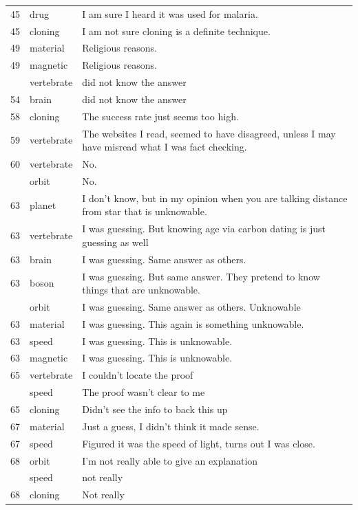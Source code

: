 \documentclass[
  doc,floatsintext]{apa6}
\begin{document}
\begin{longtable}[t]{>{}r>{}l>{\raggedright\arraybackslash}p{30em}}
45 & drug & I am sure I heard it was used for malaria.\\
45 & cloning & I am not sure cloning is a definite technique.\\
49 & material & Religious reasons.\\
49 & magnetic & Religious reasons.\\
\addlinespace
54 & vertebrate & did not know the answer\\
54 & brain & did not know the answer\\
58 & cloning & The success rate just seems too high.\\
59 & vertebrate & The websites I read, seemed to have disagreed, unless I may have misread what I was fact checking.\\
60 & vertebrate & No.\\
\addlinespace
60 & orbit & No.\\
63 & planet & I don't know, but in my opinion when you are talking distance from star that is unknowable.\\
63 & vertebrate & I was guessing.  But knowing age via carbon dating is just guessing as well\\
63 & brain & I was guessing.  Same answer as others.\\
63 & boson & I was guessing.  But same answer.  They pretend to know things that are unknowable.\\
\addlinespace
63 & orbit & I was guessing.  Same answer as others.  Unknowable\\
63 & material & I was guessing.  This again is something unknowable.\\
63 & speed & I was guessing.  This is unknowable.\\
63 & magnetic & I was guessing.  This is unknowable.\\
65 & vertebrate & I couldn’t locate the proof\\
\addlinespace
65 & speed & The proof wasn’t clear to me\\
65 & cloning & Didn’t see the info to back this up\\
67 & material & Just a guess, I didn't think it made sense.\\
67 & speed & Figured it was the speed of light, turns out I was close.\\
68 & orbit & I'm not really able to give an explanation\\
\addlinespace
68 & speed & not really\\
68 & cloning & Not really\\

\end{longtable}
\end{document}
